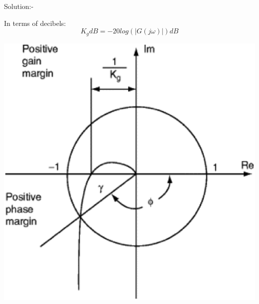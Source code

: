 \documentclass[journal,12pt,twocolumn]{IEEEtran}
\begin{document}
\begin{frame}{Solution:- }
\begin{frame}{}
In terms of decibels: 
 \begin{equation*}
    K_g dB = -20log(|G(j\omega)|) dB
\end{equation*}
    
\end{frame}

\begin{frame}{}
\begin{center}
    \includegraphics[scale = 0.25]{./figs/fig-2.eps}
\end{center}
\end{frame}


\end{frame}
\end{document}
